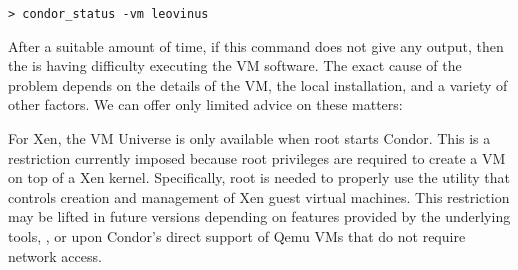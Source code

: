 \begin{verbatim}
> condor_status -vm leovinus
\end{verbatim}

After a suitable amount of time, if this command does not give any output,
then the  is having difficulty executing the VM software.
The exact cause of the problem depends on the details of the VM, the local 
installation, and a variety of other factors. We can offer only limited 
advice on these matters:

For Xen, the VM Universe is only available when root starts Condor.
This is a restriction currently imposed because root privileges are 
required to create a VM on top of a Xen kernel. Specifically, root is needed 
to properly use the  utility that controls 
creation and management of Xen guest virtual machines. This restriction 
may be lifted in future versions depending on features provided by the 
underlying tools, , or upon Condor's direct 
support of Qemu VMs that do not require network access.
